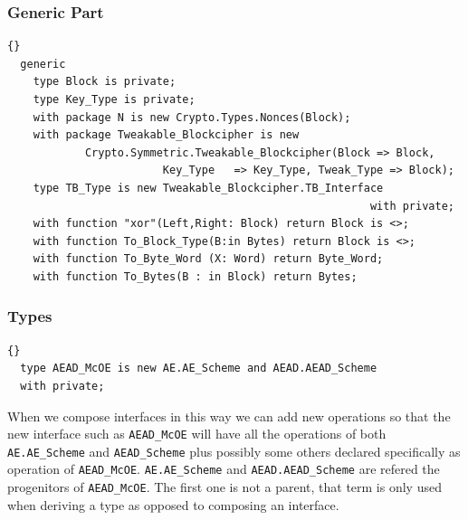 \subsubsection*{Generic Part}
\begin{lstlisting}{}
  generic
    type Block is private;
    type Key_Type is private;
    with package N is new Crypto.Types.Nonces(Block);
    with package Tweakable_Blockcipher is new
    	 	Crypto.Symmetric.Tweakable_Blockcipher(Block => Block, 
     					Key_Type   => Key_Type, Tweak_Type => Block);
    type TB_Type is new Tweakable_Blockcipher.TB_Interface 
    													with private;
    with function "xor"(Left,Right: Block) return Block is <>;
    with function To_Block_Type(B:in Bytes) return Block is <>;
    with function To_Byte_Word (X: Word) return Byte_Word; 
    with function To_Bytes(B : in Block) return Bytes;
\end{lstlisting}

\subsubsection*{Types}
\begin{lstlisting}{}
  type AEAD_McOE is new AE.AE_Scheme and AEAD.AEAD_Scheme
  with private;
\end{lstlisting}
When we compose interfaces in this way we can add new operations so
that the new interface such as \texttt{AEAD\_McOE} will have all the
operations of both \texttt{AE.AE\_Scheme} and \texttt{AEAD\_Scheme}
plus possibly some others declared specifically as operation of
\texttt{AEAD\_McOE}. \texttt{AE.AE\_Scheme} and
\texttt{AEAD.AEAD\_Scheme} are refered the progenitors of
\texttt{AEAD\_McOE}. The first one is not a parent, that term is only
used when deriving a type as opposed to composing an interface.


